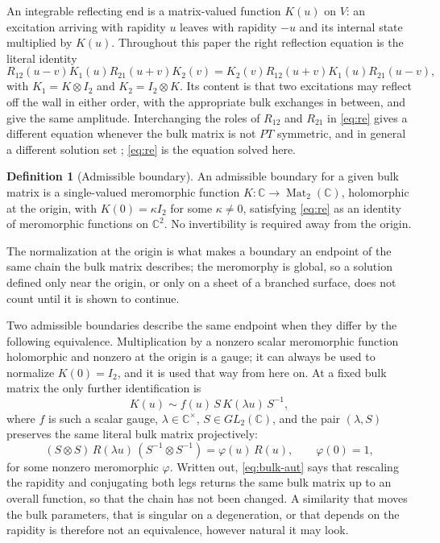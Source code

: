 \documentclass[11pt,reqno]{amsart}
\theoremstyle{plain}
\theoremstyle{definition}
\newtheorem{definition}[theorem]{Definition}
\theoremstyle{remark}
\numberwithin{equation}{section}
\newcommand{\Mat}{\operatorname{Mat}}
\newcommand{\C}{\mathbb C}
\newcommand{\Id}{I_2}
\begin{document}
An integrable reflecting end is a matrix-valued function $K(u)$ on $V$: an
excitation arriving with rapidity $u$ leaves with rapidity $-u$ and its internal
state multiplied by $K(u)$. Throughout this paper the right reflection equation
is the literal identity
\begin{equation}
R_{12}(u-v)K_1(u)R_{21}(u+v)K_2(v)
=K_2(v)R_{12}(u+v)K_1(u)R_{21}(u-v),           \label{eq:re}
\end{equation}
with $K_1=K\otimes\Id$ and $K_2=\Id\otimes K$. Its content is that two
excitations may reflect off the wall in either order, with the appropriate bulk
exchanges in between, and give the same amplitude. Interchanging the roles of
$R_{12}$ and $R_{21}$ in \cref{eq:re} gives a different equation whenever the
bulk matrix is not $PT$ symmetric, and in general a different solution set
\cite{mezincescu1991}; \cref{eq:re} is the equation solved here.

\begin{definition}[Admissible boundary]
\label{def:admissible}
An admissible boundary for a given bulk matrix is a single-valued meromorphic
function $K:\C\to\Mat_2(\C)$, holomorphic at the origin, with
$K(0)=\kappa \Id$ for some $\kappa\ne0$, satisfying \cref{eq:re} as an identity
of meromorphic functions on $\C^2$. No invertibility is required away from the
origin.
\end{definition}

The normalization at the origin is what makes a boundary an endpoint of the same
chain the bulk matrix describes; the meromorphy is global, so a solution defined
only near the origin, or only on a sheet of a branched surface, does not count
until it is shown to continue.

Two admissible boundaries describe the same endpoint when they differ by the
following equivalence. Multiplication by a nonzero scalar meromorphic function
holomorphic and nonzero at the origin is a gauge; it can always be used to
normalize $K(0)=\Id$, and it is used that way from here on. At a fixed bulk
matrix the only further identification is
\begin{equation}
K(u)\sim f(u)\,S\,K(\lambda u)\,S^{-1},                     \label{eq:equivalence}
\end{equation}
where $f$ is such a scalar gauge, $\lambda\in\C^\times$, $S\in GL_2(\C)$, and the
pair $(\lambda,S)$ preserves the same literal bulk matrix projectively:
\begin{equation}
(S\otimes S)\,R(\lambda u)\,(S^{-1}\otimes S^{-1})
=\varphi(u)\,R(u),\qquad \varphi(0)=1,                 \label{eq:bulk-aut}
\end{equation}
for some nonzero meromorphic $\varphi$. Written out, \cref{eq:bulk-aut} says that
rescaling the rapidity and conjugating both legs returns the same bulk matrix up
to an overall function, so that the chain has not been changed. A similarity that
moves the bulk parameters, that is singular on a degeneration, or that depends on
the rapidity is therefore not an equivalence, however natural it may look.
\end{document}
